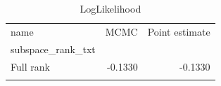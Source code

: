 \begin{table}[H]
\caption{LogLikelihood}
\begin{tabular}{lrr}
\toprule
name & MCMC & Point estimate \\
subspace_rank_txt &  &  \\
\midrule
Full rank & -0.1330 & -0.1330 \\
\label{UCI_wine_table2}
\bottomrule
\end{tabular}
\end{table}
